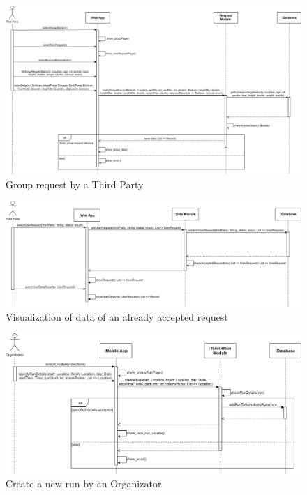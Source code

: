 \begin{figure}[H]
    \centering
    \includegraphics[scale=0.35]{./Pictures/groupRequestSeqDiagDD.png}
    \caption{Group request by a Third Party}
\end{figure}

\begin{figure}[H]
    \centering
    \includegraphics[scale=0.35]{./Pictures/showDataResult.png}
    \caption{Visualization of data of an already accepted request}
\end{figure}


\begin{figure}[H]
    \centering
    \includegraphics[scale=0.35]{./Pictures/createRunSeqDiagDD.png}
    \caption{Create a new run by an Organizator}
\end{figure}


